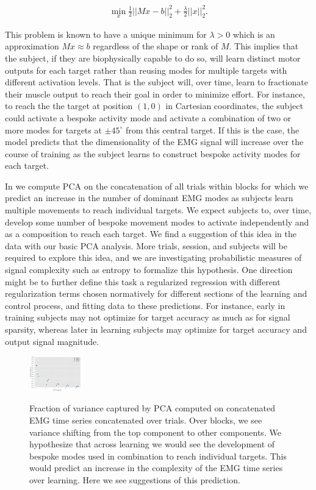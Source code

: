 \documentclass[../main.tex]{subfiles}
\begin{document}
\begin{align}
  \min_x\frac{1}{2}||Mx - b||^2_2 + \frac{\lambda}{2}||x||_2^2.
\end{align}

This problem is known to have a unique minimum for $\lambda>0$ which is an approximation $Mx\approx b$ regardless of the shape or rank of $M$. This implies that the subject, if they are biophysically capable to do so, will learn distinct motor outputs for each target rather than reusing modes for multiple targets with different activation levels. That is the subject will, over time, learn to fractionate their muscle output to reach their goal in order to minimize effort. For instance, to reach the the target at position $(1,0)$ in Cartesian coordinates, the subject could activate a bespoke activity mode and activate a combination of two or more modes for targets at $\pm45^\circ$ from this central target. If this is the case, the model predicts that the dimensionality of the EMG signal will increase over the course of training as the subject learns to construct bespoke activity modes for each target.

In  we compute PCA on the concatenation of all trials within blocks for which we predict an increase in the number of dominant EMG modes as subjects learn multiple movements to reach individual targets. We expect subjects to, over time, develop some number of bespoke movement modes to activate independently and as a composition to reach each target. We find a suggestion of this idea in the data with our basic PCA analysis. More trials, session, and subjects will be required to explore this idea, and we are investigating probabilistic measures of signal complexity such as entropy to formalize this hypothesis. One direction might be to further define this task a regularized regression with different regularization terms chosen normatively for different sections of the learning and control process, and fitting data to these predictions. For instance, early in training subjects may not optimize for target accuracy as much as for signal sparsity, whereas later in learning subjects may optimize for target accuracy and output signal magnitude.

\begin{figure}
\label{fig:PCA_concat_variance}
\centering
\includegraphics[width=0.2\textwidth]{images/data_analysis/center_hold/PCA_concat_variance.pdf}
\caption{Fraction of variance captured by PCA computed on concatenated EMG time series concatenated over trials. Over blocks, we see variance shifting from the top component to other components. We hypothesize that across learning we would see the development of bespoke modes used in combination to reach individual targets. This would predict an increase in the complexity of the EMG time series over learning. Here we see suggestions of this prediction.}\label{fig:PCA_concat_variance}
\end{figure}
\end{document}
